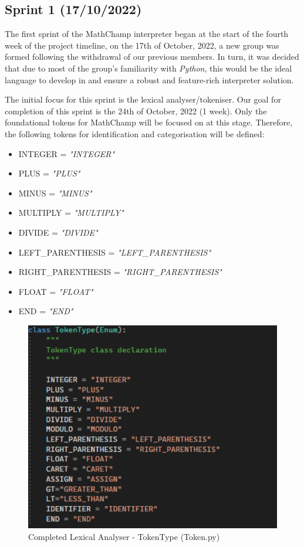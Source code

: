 \documentclass[a4paper, oneside, 11pt]{report}
\begin{document}
\subsection{Sprint 1 (17/10/2022)}
The first sprint of the MathChamp interpreter began at the start of the fourth week of the project timeline, on the 17th of October, 2022, a new group was formed following the withdrawal of our previous members. In turn, it was decided that due to most of the group's familiarity with \emph{Python}, this would be the ideal language to develop in and ensure a robust and feature-rich interpreter solution. 

The initial focus for this sprint is the lexical analyser/tokeniser. Our goal for completion of this sprint is the 24th of October, 2022 (1 week). Only the foundational tokens for MathChamp will be focused on at this stage. Therefore, the following tokens for identification and categorisation will be defined:

\begin{itemize} \label{InitialTokens}
    \item INTEGER = \textit{"INTEGER"}
    \item PLUS = \textit{"PLUS"}
    \item MINUS = \textit{"MINUS"}
    \item MULTIPLY = \textit{"MULTIPLY"}
    \item DIVIDE = \textit{"DIVIDE"}
    \item LEFT\_PARENTHESIS = \textit{"LEFT\_PARENTHESIS"}
    \item RIGHT\_PARENTHESIS = \textit{"RIGHT\_PARENTHESIS"}
    \item FLOAT = \textit{"FLOAT"}
    \item END = \textit{"END"}
\end{itemize}

\begin{figure}[h]
    \centering
    \includegraphics[width=12.0cm]{tokenClass1.png}
    \caption{Completed Lexical Analyser - TokenType (Token.py)}
    \label{fig:bnf}
\end{figure}
\newpage
\end{document}
